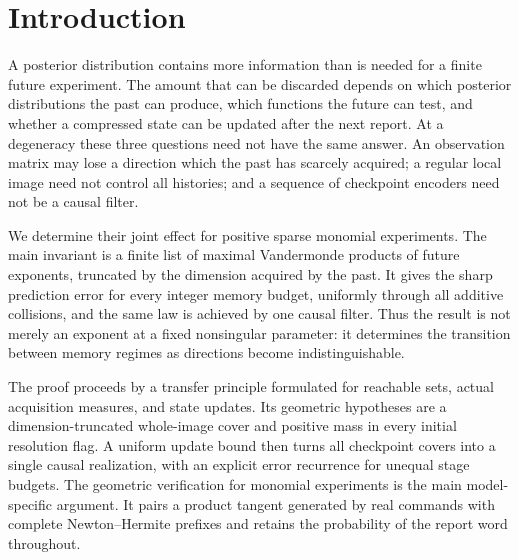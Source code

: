 \section{Introduction}
A posterior distribution contains more information than is needed for a
finite future experiment. The amount that can be discarded depends on
which posterior distributions the past can produce, which functions the
future can test, and whether a compressed state can be updated after the
next report. At a degeneracy these three questions need not have the
same answer. An observation matrix may lose a direction which the past
has scarcely acquired; a regular local image need not control all
histories; and a sequence of checkpoint encoders need not be a causal
filter.

We determine their joint effect for positive sparse monomial experiments.
The main invariant is a finite list of maximal Vandermonde products of
future exponents, truncated by the dimension acquired by the past. It
gives the sharp prediction error for every integer memory budget,
uniformly through all additive collisions, and the same law is achieved
by one causal filter. Thus the result is not merely an exponent at a
fixed nonsingular parameter: it determines the transition between
memory regimes as directions become indistinguishable.

The proof proceeds by a transfer principle formulated for reachable
sets, actual acquisition measures, and state updates. Its geometric
hypotheses are a dimension-truncated whole-image cover and positive
mass in every initial resolution flag. A uniform update bound then
turns all checkpoint covers into a single causal realization, with an
explicit error recurrence for unequal stage budgets. The geometric
verification for monomial experiments is the main model-specific
argument. It pairs a product tangent generated by real commands with
complete Newton--Hermite prefixes and retains the probability of the
report word throughout.

